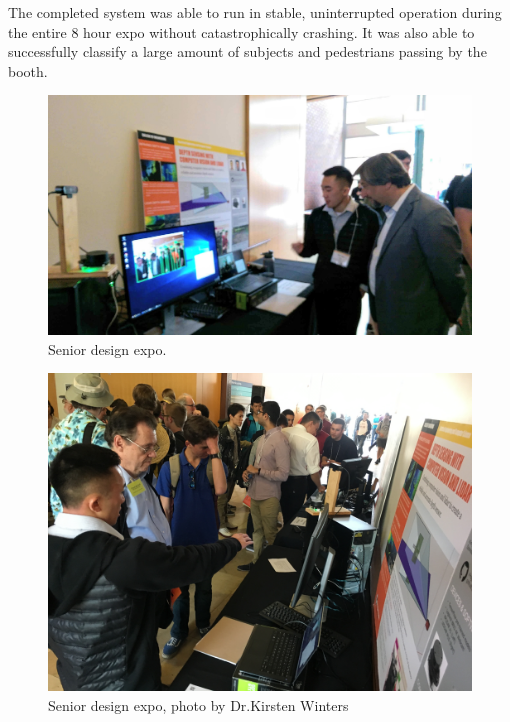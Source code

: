 \documentclass[onecolumn, draftclsnofoot,10pt, compsoc]{IEEEtran}
\makeatletter
\newcommand\captionof[1]{\def\@captype{#1}\caption}
\makeatother
\begin{document}
\begin{singlespace}
	The completed system was able to run in stable, uninterrupted operation during the entire 8 hour expo without catastrophically crashing. 
	It was also able to successfully classify a large amount of subjects and pedestrians passing by the booth.

	\begin{figure}[H]
	\includegraphics[scale=0.15]{expo1.jpg}
	\captionof{figure}{Senior design expo.}
	\label{expo1}
	\end{figure}

	\begin{figure}[H]
	\includegraphics[scale=0.07]{expo2.jpg}
	\captionof{figure}{Senior design expo, photo by Dr.Kirsten Winters}
	\label{expo2}
	\end{figure}

\end{singlespace}
\end{document}
